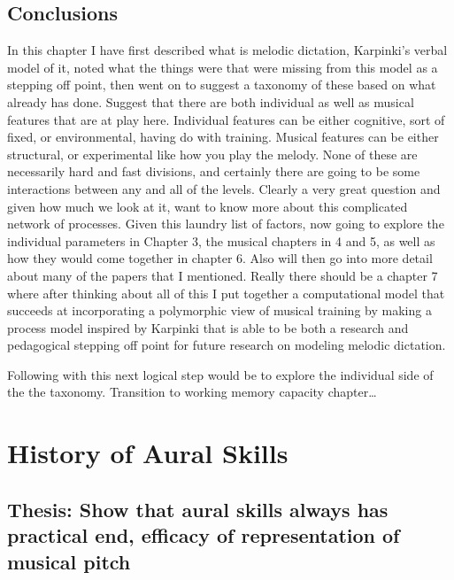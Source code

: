 \documentclass[]{book}
\theoremstyle{definition}
\theoremstyle{definition}
\theoremstyle{definition}
\theoremstyle{remark}
\begin{document}
\hypertarget{conclusions}{%
\section{Conclusions}\label{conclusions}}

In this chapter I have first described what is melodic dictation,
Karpinki's verbal model of it, noted what the things were that were
missing from this model as a stepping off point, then went on to suggest
a taxonomy of these based on what already has done. Suggest that there
are both individual as well as musical features that are at play here.
Individual features can be either cognitive, sort of fixed, or
environmental, having do with training. Musical features can be either
structural, or experimental like how you play the melody. None of these
are necessarily hard and fast divisions, and certainly there are going
to be some interactions between any and all of the levels. Clearly a
very great question and given how much we look at it, want to know more
about this complicated network of processes. Given this laundry list of
factors, now going to explore the individual parameters in Chapter 3,
the musical chapters in 4 and 5, as well as how they would come together
in chapter 6. Also will then go into more detail about many of the
papers that I mentioned. Really there should be a chapter 7 where after
thinking about all of this I put together a computational model that
succeeds at incorporating a polymorphic view of musical training by
making a process model inspired by Karpinki that is able to be both a
research and pedagogical stepping off point for future research on
modeling melodic dictation.

Following with this next logical step would be to explore the individual
side of the the taxonomy. Transition to working memory capacity
chapter\ldots{}

\hypertarget{history-of-aural-skills}{%
\chapter{History of Aural Skills}\label{history-of-aural-skills}}

\hypertarget{thesis-show-that-aural-skills-always-has-practical-end-efficacy-of-representation-of-musical-pitch}{%
\section{Thesis: Show that aural skills always has practical end,
efficacy of representation of musical
pitch}\label{thesis-show-that-aural-skills-always-has-practical-end-efficacy-of-representation-of-musical-pitch}}
\end{document}

